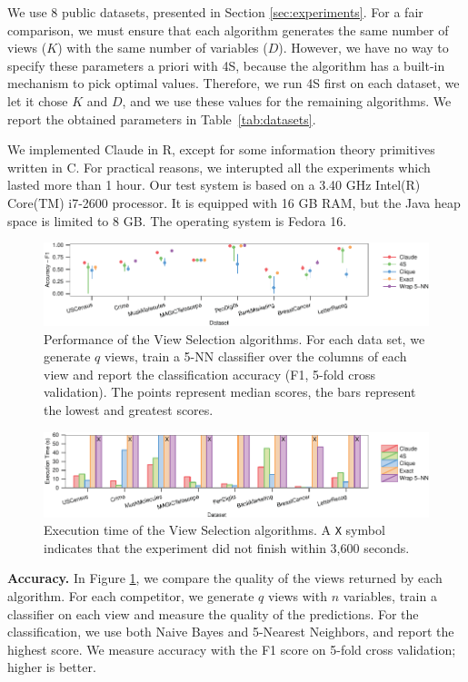 We use 8 public datasets, presented in Section \ref{sec:experiments}. For a
fair comparison, we must ensure that each algorithm generates the same number
of views ($K$) with the same number of variables ($D$).  However, we have no
way to specify these parameters a priori with 4S, because the algorithm has a
built-in mechanism to pick optimal values. Therefore, we run 4S first on each
dataset, we let it chose $K$ and $D$, and we use these values for the remaining
algorithms.  We report the obtained parameters in Table~\ref{tab:datasets}.

We implemented Claude in R, except for some information theory primitives
written in C. For practical reasons, we interupted all the experiments which
lasted more than 1 hour. Our test system is based on a 3.40 GHz Intel(R)
Core(TM) i7-2600 processor. It is equipped with 16 GB RAM, but the Java heap
space is limited to 8 GB. The operating system is Fedora 16. 

\begin{figure}[t!]
\centering
\includegraphics[width=2\columnwidth]{plots/view-scores}
\caption{Performance of the View Selection algorithms. For each data set, we
    generate $q$ views, train a 5-NN classifier over the columns of each view
    and report the classification accuracy (F1, 5-fold cross validation). The
    points represent median scores, the bars represent the lowest and greatest
    scores.} 
\label{pic:column-select-score}
\end{figure}
\begin{figure}[t!]
\centering
\includegraphics[width=2\columnwidth]{plots/view-times}
\caption{Execution time of the View Selection algorithms. A \texttt{X} symbol
indicates that the experiment did not finish within 3,600 seconds.}
\label{pic:column-select-time}
\end{figure}

\textbf{Accuracy.} In Figure \ref{pic:column-select-score}, we compare the
quality of the views returned by each algorithm. For each competitor, we
generate $q$ views with $n$ variables, train a classifier on each view and
measure the quality of the predictions. For the classification, we use both
Naive Bayes and 5-Nearest Neighbors, and report the highest score.  We measure
accuracy with the F1 score on 5-fold cross validation; higher is better.

